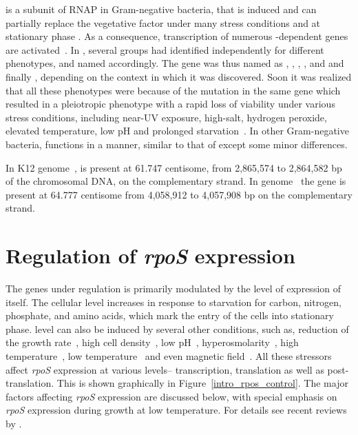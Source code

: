 \sigs{} is a subunit of RNAP in Gram-negative bacteria, that is
induced and can partially replace the vegetative \s{} factor under
many stress conditions and at stationary phase . As a consequence,
transcription of numerous \sigs{}-dependent genes are
activated~\citep[reviewed
in][Table~\ref{chap1:rpos_genes}]{Loewen1994,Hengge1996,Ishihama2000}.
In , several groups had identified  independently
for different phenotypes, and named accordingly. The gene was thus
named as , , , , and  and
finally , depending on the context in which it was
discovered. Soon it was realized that all these phenotypes were
because of the mutation in the same gene which resulted in a
pleiotropic phenotype with a rapid loss of viability under various
stress conditions, including near-UV exposure, high-salt, hydrogen
peroxide, elevated temperature, low pH and prolonged
starvation~\citep{Loewen1994,Hengge2002,Hengge1996}. In other
Gram-negative bacteria,  functions in a manner, similar to
that of  except some minor differences.




In  K12 genome~\citep{Blattner1997},  is present
at 61.747 centisome, from 2,865,574 to 2,864,582 bp of the
chromosomal DNA, on the complementary strand. In 
genome~\citep{Stover2000} the gene is present at 64.777 centisome
from 4,058,912 to 4,057,908 bp on the complementary strand.

\section{Regulation of \emph{rpoS} expression}
The genes under  regulation is primarily modulated by the
level of expression of  itself. The cellular \sigs{} level
increases in response to starvation for carbon, nitrogen,
phosphate, and amino acids, which mark the entry of the cells into
stationary phase. \sigs{} level can also be induced by several
other conditions, such as, reduction of the growth
rate~\citep{Gentry1993,Jishage1995,Jishage1996,Lange1991,Lange1994,Notley1996},
high cell density~\citep{Lange1994}, low pH~\citep{Bearson1996},
hyperosmolarity~\citep{Muffler1996}, high
temperature~\citep{Muffler1997}, low
temperature~\citep{Sledjeski1996} and even magnetic
field~\citep{Tsuchiya1999}. All these stressors affect \emph{rpoS}
expression at various levels-- transcription, translation as well
as post-translation. This is shown graphically in
Figure~\ref{intro_rpos_control}. The major factors affecting
\emph{rpoS} expression are discussed below, with special emphasis
on \emph{rpoS} expression during growth at low temperature. For
details see recent reviews by \citet{Hengge2002b,Hengge2002}.

